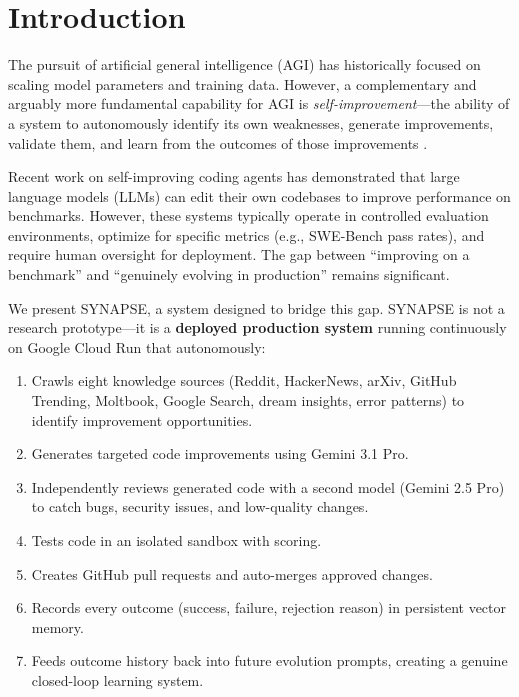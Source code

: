 \documentclass[11pt,a4paper]{article}
\begin{document}
\section{Introduction}
\label{sec:introduction}

The pursuit of artificial general intelligence (AGI) has historically focused on scaling model parameters and training data. However, a complementary and arguably more fundamental capability for AGI is \textit{self-improvement}---the ability of a system to autonomously identify its own weaknesses, generate improvements, validate them, and learn from the outcomes of those improvements \cite{schmidhuber2003godel, legg2007universal}.

Recent work on self-improving coding agents \cite{sica2025, selfimproving2025openreview} has demonstrated that large language models (LLMs) can edit their own codebases to improve performance on benchmarks. However, these systems typically operate in controlled evaluation environments, optimize for specific metrics (e.g., SWE-Bench pass rates), and require human oversight for deployment. The gap between ``improving on a benchmark'' and ``genuinely evolving in production'' remains significant.

We present SYNAPSE, a system designed to bridge this gap. SYNAPSE is not a research prototype---it is a \textbf{deployed production system} running continuously on Google Cloud Run that autonomously:

\begin{enumerate}[noitemsep]
    \item Crawls eight knowledge sources (Reddit, HackerNews, arXiv, GitHub Trending, Moltbook, Google Search, dream insights, error patterns) to identify improvement opportunities.
    \item Generates targeted code improvements using Gemini 3.1 Pro.
    \item Independently reviews generated code with a second model (Gemini 2.5 Pro) to catch bugs, security issues, and low-quality changes.
    \item Tests code in an isolated sandbox with scoring.
    \item Creates GitHub pull requests and auto-merges approved changes.
    \item Records every outcome (success, failure, rejection reason) in persistent vector memory.
    \item Feeds outcome history back into future evolution prompts, creating a genuine closed-loop learning system.
\end{enumerate}
\end{document}
